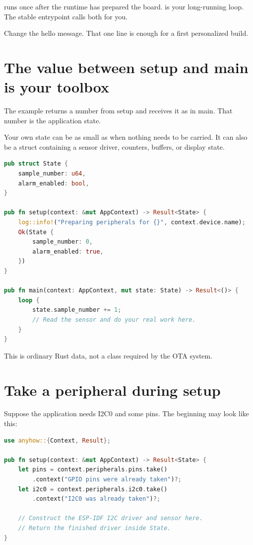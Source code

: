  runs once after the runtime has prepared the board.  is your long-running loop. The stable entrypoint calls both for you.

Change the hello message. That one line is enough for a first personalized build.

\section{The value between setup and main is your toolbox}

The example returns a number from setup and receives it as  in main. That number is the application state.

Your own state can be as small as \codepath{()} when nothing needs to be carried. It can also be a struct containing a sensor driver, counters, buffers, or display state.

\begin{lstlisting}[language=Rust]
pub struct State {
    sample_number: u64,
    alarm_enabled: bool,
}

pub fn setup(context: &mut AppContext) -> Result<State> {
    log::info!("Preparing peripherals for {}", context.device.name);
    Ok(State {
        sample_number: 0,
        alarm_enabled: true,
    })
}

pub fn main(context: AppContext, mut state: State) -> Result<()> {
    loop {
        state.sample_number += 1;
        // Read the sensor and do your real work here.
    }
}
\end{lstlisting}

This is ordinary Rust data, not a class required by the OTA system.

\section{Take a peripheral during setup}

Suppose the application needs I2C0 and some pins. The beginning may look like this:

\begin{lstlisting}[language=Rust]
use anyhow::{Context, Result};

pub fn setup(context: &mut AppContext) -> Result<State> {
    let pins = context.peripherals.pins.take()
        .context("GPIO pins were already taken")?;
    let i2c0 = context.peripherals.i2c0.take()
        .context("I2C0 was already taken")?;

    // Construct the ESP-IDF I2C driver and sensor here.
    // Return the finished driver inside State.
}
\end{lstlisting}

